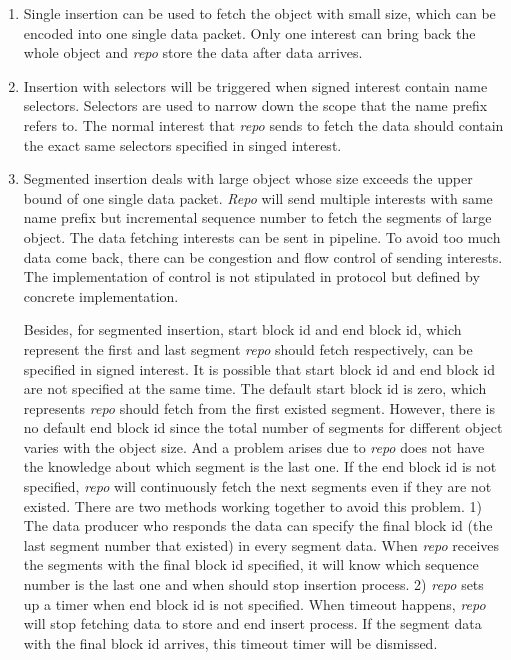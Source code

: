\documentclass[conference]{IEEEtran}
\begin{document}
\begin{enumerate}
\item Single insertion can be used to fetch the object with small size, which can be encoded into one single data packet. Only one interest can bring back the whole object and \emph{repo} store the data after data arrives.
\item Insertion with selectors will be triggered when signed interest contain name selectors. Selectors are used to narrow down the scope that the name prefix refers to. The normal interest that \emph{repo} sends to fetch the data should contain the exact same selectors specified in singed interest.
\item Segmented insertion deals with large object whose size exceeds the upper bound of one single data packet. \emph{Repo} will send multiple interests with same name prefix but incremental sequence number to fetch the segments of large object. The data fetching interests can be sent in pipeline. To avoid too much data come back, there can be congestion and flow control of sending interests. The implementation of control is not stipulated in protocol but defined by concrete implementation.

    Besides, for segmented insertion, start block id and end block id, which represent the first and last segment \emph{repo} should fetch respectively, can be specified in signed interest. It is possible that start block id and end block id are not specified at the same time. The default start block id is zero, which represents \emph{repo} should fetch from the first existed segment. However, there is no default end block id since the total number of segments for different object varies with the object size. And a problem arises due to \emph{repo} does not have the knowledge about which segment is the last one. If the end block id is not specified, \emph{repo} will continuously fetch the next segments even if they are not existed. There are two methods working together to avoid this problem. 1) The data producer who responds the data can specify the final block id (the last segment number that existed) in every segment data. When \emph{repo} receives the segments with the final block id specified, it will know which sequence number is the last one and when should stop insertion process. 2) \emph{repo} sets up a timer when end block id is not specified. When timeout happens, \emph{repo} will stop fetching data to store and end insert process. If the segment data with the final block id arrives, this timeout timer will be dismissed.
\end{enumerate}
\end{document}
